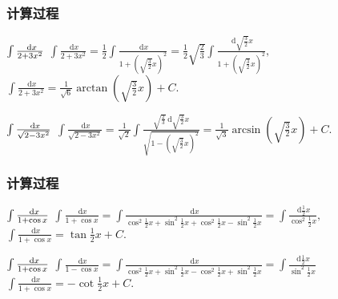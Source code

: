 \documentclass[
10pt,
aspectratio=43,
]{beamer}
\begin{document}
\begin{frame}
	\frametitle{计算过程}
	\everymath{\displaystyle}
	\begin{exampleblock}{$\color{black}\int \frac{\mathrm{~d} x}{2+3 x^2}$}
		$
			\int \frac{\mathrm{~d} x}{2+3 x^2}=\frac{1}{2}\int \frac{\mathrm{~d} x}{1+ \left(\sqrt{\frac{3}{2}}x\right)^2}=\frac{1}{2}\sqrt{\frac{2}{3}}\int \frac{\mathrm{~d}\sqrt{\frac{3}{2}} x}{1+ \left(\sqrt{\frac{3}{2}}x\right)^2},
		$\\
		$
			\int \frac{\mathrm{~d} x}{2+3 x^2}=\frac{1}{\sqrt{6}}\arctan\left(\sqrt{\frac{3}{2}}x\right)+C.
		$
	\end{exampleblock}
	\pause
	\begin{exampleblock}{$\color{black}\int \frac{\mathrm{~d} x}{\sqrt{2-3 x^2}}$}
		$
			\int \frac{\mathrm{~d} x}{\sqrt{2-3 x^2}}=\frac{1}{\sqrt{2}}\int \frac{\sqrt{\frac{2}{3}}\mathrm{~d}\sqrt{\frac{3}{2}}x}{\sqrt{1-\left(\sqrt{\frac{3}{2}}x\right)^2}}=\frac{1}{\sqrt{3}} \arcsin \left(\sqrt{\frac{3}{2}} x\right)+C.
		$
	\end{exampleblock}
\end{frame}

\begin{frame}
	\frametitle{计算过程}
	\everymath{\displaystyle}
	\begin{exampleblock}{$\color{black}\int \frac{\mathrm{~d} x}{1+\cos x}$}
		$
			\int \frac{\mathrm{~d} x}{1+\cos x}=\int \frac{\mathrm{~d} x}{\cos^2\frac{1}{2}x + \sin^2\frac{1}{2}x+ \cos^2\frac{1}{2}x - \sin^2\frac{1}{2}x}=\int \frac{\mathrm{~d}\frac{1}{2}x}{\cos^2\frac{1}{2}x},
		$\\
		$
			\int \frac{\mathrm{~d} x}{1+\cos x}=\tan\frac{1}{2}x+C.
		$
	\end{exampleblock}
	\pause
	\begin{exampleblock}{$\color{black}\int \frac{\mathrm{~d} x}{1+\cos x}$}
		$
			\int \frac{\mathrm{~d} x}{1-\cos x}=\int \frac{\mathrm{~d} x}{\cos^2\frac{1}{2}x + \sin^2\frac{1}{2}x- \cos^2\frac{1}{2}x + \sin^2\frac{1}{2}x}=\int \frac{\mathrm{~d}\frac{1}{2}x}{\sin^2\frac{1}{2}x}
		$\\
		$
			\int \frac{\mathrm{~d} x}{1+\cos x}=-\cot\frac{1}{2}x+C.
		$
	\end{exampleblock}
\end{frame}
\end{document}
